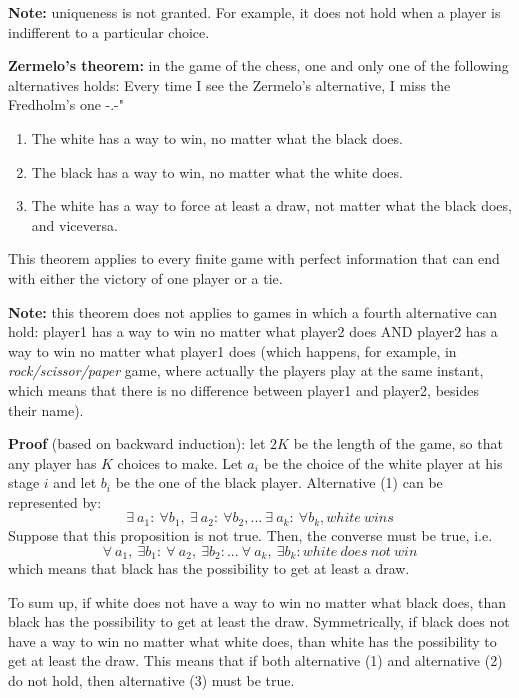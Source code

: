 \noindent \textbf{Note:} uniqueness is not granted. For example, it does not 
hold when a player is indifferent to a particular choice.

\bigskip
\noindent \textbf{Zermelo's theorem:} in the game of the chess, one and only 
one of the following alternatives holds: {\huge Every time I see the Zermelo's 
alternative, I miss the Fredholm's one -.-"}
\begin{enumerate}
	\item The white has a way to win, no matter what the black does.
	\item The black has a way to win, no matter what the white does.
	\item The white has a way to force at least a draw, not matter what the 
	black does, and viceversa.
\end{enumerate}
This theorem applies to every finite game with perfect information 
that can end with either the victory of one player or a tie.

\noindent \textbf{Note:} this theorem does not applies to games in which a 
fourth alternative can hold: player1 has a way to win no matter what player2 
does AND player2 has a way to win no matter what player1 does (which 
happens, for example, in \textit{rock/scissor/paper} game, where actually 
the players play at the same instant, which means that there is no difference 
between player1 and player2, besides their name).

\bigskip
\noindent \textbf{Proof} (based on backward induction): let $2K$ be the length 
of the game, so that any player has $K$ choices to make. Let $a_i$ be the 
choice of the white player at his stage $i$ and let $b_i$ be the one of the 
black player. Alternative (1) can be represented by:
\[
	\exists~a_1: ~\forall b_1, ~\exists~a_2: ~\forall b_2,...
	~\exists~a_k: ~\forall b_k, white~wins
\]
Suppose that this proposition is not true. Then, the converse must be true, 
i.e.
\[
	\forall~a_1, ~\exists b_1: ~\forall~a_2, ~\exists b_2:...
	~\forall~a_k, ~\exists b_k: white~does~not~win
\]
which means that black has the possibility to get at least a draw.

\noindent To sum up, if white does not have a way to win no matter what black 
does, than black has the possibility to get at least the draw. Symmetrically, 
if black does not have a way to win no matter what white does, than white has 
the possibility to get at least the draw. This means that if both alternative 
(1) and alternative (2) do not hold, then alternative (3) must be true.

